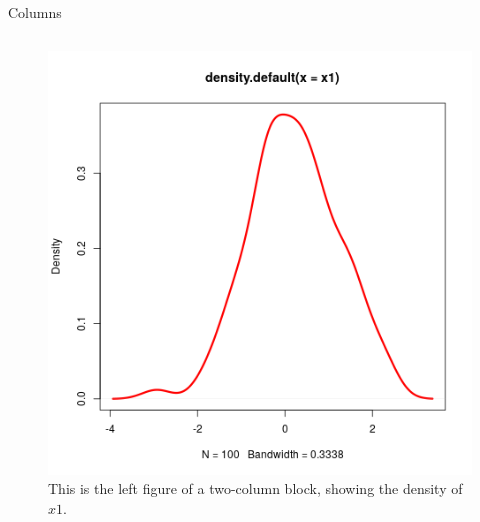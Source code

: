 \documentclass[final]{beamer}
\begin{document}
\begin{frame}[fragile,label={sec:org88bd8a7}]{}
\begin{columns}
\begin{column}[t]{0.45\columnwidth}
\begin{block}{Columns}
\begin{columns}
\begin{column}[T]{0.48\columnwidth}
\captionsetup{justification=justified,width=.85\linewidth}
\begin{figure}[htbp]
\centering
\includegraphics[width=.9\linewidth]{4l.png}
\caption{\label{fig:orgf59c614}
This is the left figure of a two-column block, showing the density of \(x1\).}
\end{figure}
\end{column}


\end{columns}
\end{block}
\end{column}
\end{columns}
\end{frame}
\end{document}
